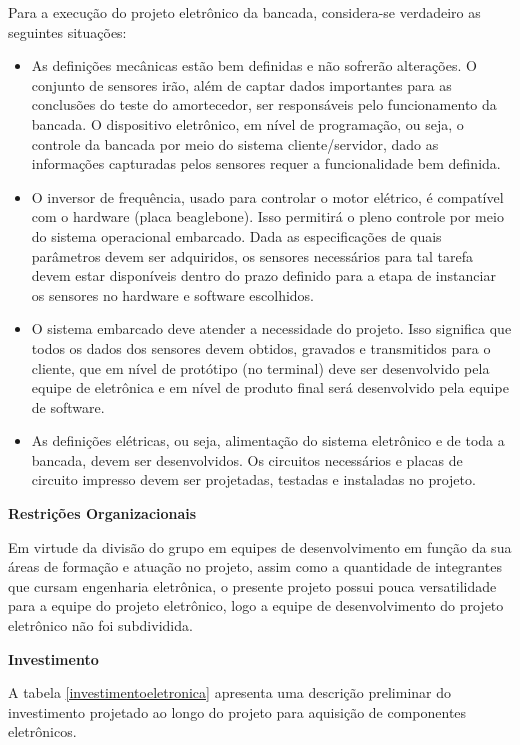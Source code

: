 	Para a execução do projeto eletrônico da bancada, considera-se verdadeiro as seguintes situações:
	\begin{itemize}

		\item As definições mecânicas estão bem definidas e não sofrerão alterações. O conjunto de sensores irão, além de captar dados importantes para as conclusões do teste do amortecedor, ser responsáveis pelo funcionamento da bancada. O dispositivo eletrônico, em nível de programação, ou seja, o controle da bancada por meio do sistema cliente/servidor, dado as informações capturadas pelos sensores requer a funcionalidade bem definida.
		\item O inversor de frequência, usado para controlar o motor elétrico, é compatível com o hardware (placa beaglebone). Isso permitirá o pleno controle por meio do sistema operacional embarcado.
		Dada as especificações de quais parâmetros devem ser adquiridos, os sensores necessários para tal tarefa devem estar disponíveis dentro do prazo definido para a etapa de instanciar os sensores no hardware e software escolhidos.
		\item O sistema embarcado deve atender a necessidade do projeto. Isso significa que todos os dados dos sensores devem obtidos, gravados e transmitidos para o cliente, que em nível de protótipo (no terminal) deve ser desenvolvido pela equipe de eletrônica e em nível de produto final será desenvolvido pela equipe de software.
		\item As definições elétricas, ou seja, alimentação do sistema eletrônico e de toda a bancada, devem ser desenvolvidos. Os circuitos necessários e placas de circuito impresso devem ser projetadas, testadas e instaladas no projeto.

	\end{itemize}

	\textbf{Restrições Organizacionais}

	Em virtude da divisão do grupo em equipes de desenvolvimento em função da sua áreas de formação e atuação no projeto, assim como a quantidade de integrantes que cursam engenharia eletrônica, o presente projeto possui pouca versatilidade para a equipe do projeto eletrônico, logo a equipe de desenvolvimento do projeto eletrônico não foi subdividida.

	\textbf{Investimento}

	A tabela \ref{investimentoeletronica} apresenta uma descrição preliminar do investimento projetado ao longo do projeto para aquisição de componentes eletrônicos.

